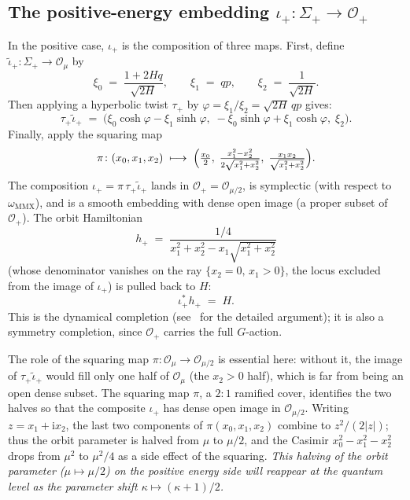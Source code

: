 \documentclass[11pt]{article}
\theoremstyle{plain}
\theoremstyle{definition}
\theoremstyle{remark}
\newcommand{\OO}{\mathcal{O}}
\newcommand{\ii}{\mathrm{i}}
\begin{document}
\subsection{The positive-energy embedding
  \texorpdfstring{$\iota_{+}:\Sigma_{+}\to\OO_{+}$}{iota\_+}}

In the positive case, $\iota_{+}$ is the composition of three maps. First,
define $\tilde\iota_{+}\colon\Sigma_{+}\to\OO_{\mu}$ by
\begin{equation}\label{eq:tildeiotaplus}
  \xi_{0}\;=\;\frac{1+2Hq}{\sqrt{2H}},\qquad
  \xi_{1}\;=\;qp,\qquad
  \xi_{2}\;=\;\frac{1}{\sqrt{2H}}.
\end{equation}
Then applying a hyperbolic twist $\tau_{+}$ by $\varphi=\xi_{1}/\xi_{2}=\sqrt{2H}\,qp$ gives:
\begin{equation}\label{eq:tauiotaplus} \tau_{+}\tilde\iota_{+}\;=\;\bigl(\xi_{0}\cosh\varphi-\xi_{1}\sinh\varphi,\;-\xi_{0}\sinh\varphi+\xi_{1}\cosh\varphi,\;\xi_{2}\bigr).
\end{equation}
Finally, apply the squaring map
\begin{equation}\label{eq:squaring}
  \pi\colon (x_{0},x_{1},x_{2})\;\longmapsto\;
  \Bigl(\tfrac{x_{0}}{2},\;\tfrac{x_{1}^{2}-x_{2}^{2}}{2\sqrt{x_{1}^{2}+x_{2}^{2}}},\;\tfrac{x_{1}x_{2}}{\sqrt{x_{1}^{2}+x_{2}^{2}}}\Bigr).
\end{equation}
The composition $\iota_{+}=\pi\,\tau_{+}\tilde\iota_{+}$ lands in
$\OO_{+}=\OO_{\mu/2}$, is symplectic (with respect to
$\omega_{\text{MMX}}$), and is a smooth embedding with dense
open image (a proper subset of $\OO_{+}$). The orbit Hamiltonian
\[
  h_{+}\;=\;\frac{1/4}{x_{1}^{2}+x_{2}^{2}-x_{1}\sqrt{x_{1}^{2}+x_{2}^{2}}}
\]
(whose denominator vanishes on the ray $\{x_{2}=0,\,x_{1}>0\}$, the
locus excluded from the image of $\iota_{+}$)
is pulled back to $H$:
\begin{equation}\label{eq:pullbackplus}
  \boxed{\;\iota_{+}^{*}h_{+}\;=\;H.\;}
\end{equation}
This is the dynamical completion (see~\cite{MMX2025} for the detailed argument); it is also a symmetry completion, since $\OO_{+}$ carries the full $G$-action.

The role of the squaring map $\pi\colon\OO_{\mu}\to\OO_{\mu/2}$ is essential here: without it, the image
of $\tau_{+}\tilde\iota_{+}$ would fill only one half of $\OO_{\mu}$
(the $x_{2}>0$ half), which is far from being an open dense subset.
The squaring map $\pi$, a $2{:}1$ ramified cover, identifies the two halves
so that the composite $\iota_{+}$ has dense open image in $\OO_{\mu/2}$. Writing $z=x_{1}+\ii x_{2}$, the
last two components of $\pi(x_{0},x_{1},x_{2})$ combine to $z^{2}/(2|z|)$; thus
the orbit parameter is halved from $\mu$ to $\mu/2$, and the Casimir
$x_{0}^{2}-x_{1}^{2}-x_{2}^{2}$ drops from $\mu^{2}$ to $\mu^{2}/4$
as a side effect of the squaring. \emph{This halving of the orbit parameter ($\mu\mapsto\mu/2$) on the positive
energy side will reappear at the quantum level as the parameter shift
$\kappa\mapsto(\kappa+1)/2$.}
\end{document}
